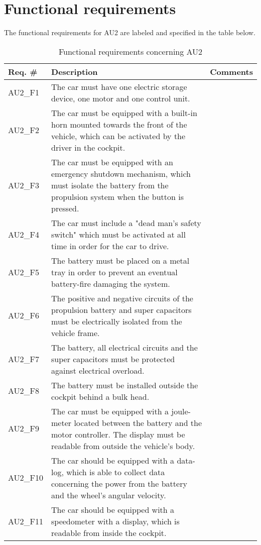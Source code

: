 \section{Functional requirements}
The functional requirements for AU2 are labeled and specified in the table below.

\begin{table}[h!]
	\label{FREQ_AU2}
	\centering
	\begin{tabular}{|p{2 cm}|p{7 cm}|p{4 cm}|}
		\hline
		\textbf{Req. \#} & \textbf{Description} & \textbf{Comments} \\\hline
		AU2\_F1		& The car must have one electric storage device, one motor and one control unit. &   \\\hline
		AU2\_F2		& The car must be equipped with a built-in horn mounted towards the front of the vehicle, which can be activated by the driver in the cockpit. &   \\\hline
		AU2\_F3		& The car must be equipped with an emergency shutdown mechanism, which must isolate the battery from the propulsion system when the button is pressed. &   \\\hline
		AU2\_F4		& The car must include a "dead man's safety switch" which must be activated at all time in order for the car to drive. &   \\\hline
		AU2\_F5		& The battery must be placed on a metal tray in order to prevent an eventual battery-fire damaging the system. &   \\\hline
		AU2\_F6		& The positive and negative circuits of the propulsion battery and super capacitors must be electrically isolated from the vehicle frame. &   \\\hline
		AU2\_F7		& The battery, all electrical circuits and the super capacitors must be protected against electrical overload. &   \\\hline
		AU2\_F8		& The battery must be installed outside the cockpit behind a bulk head. &   \\\hline
		AU2\_F9		& The car must be equipped with a joule-meter located between the battery and the motor controller. The display must be readable from outside the vehicle's body. &   \\\hline
		AU2\_F10	& The car should be equipped with a data-log, which is able to collect data concerning the power from the battery and the wheel's angular velocity. &   \\\hline
		AU2\_F11 \fxnote{Holder vi fast i dette?}	& The car should be equipped with a speedometer with a display, which is readable from inside the cockpit. &   \\\hline
	\end{tabular}
	\caption{Functional requirements concerning AU2}
\end{table}